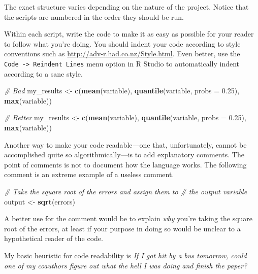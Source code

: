 \documentclass[12pt,oneside,openany]{tufte-book}
\newenvironment{Shaded}{}{}
\newcommand{\KeywordTok}[1]{\textcolor[rgb]{0.00,0.44,0.13}{\textbf{{#1}}}}
\newcommand{\DataTypeTok}[1]{\textcolor[rgb]{0.56,0.13,0.00}{{#1}}}
\newcommand{\FloatTok}[1]{\textcolor[rgb]{0.25,0.63,0.44}{{#1}}}
\newcommand{\StringTok}[1]{\textcolor[rgb]{0.25,0.44,0.63}{{#1}}}
\newcommand{\CommentTok}[1]{\textcolor[rgb]{0.38,0.63,0.69}{\textit{{#1}}}}
\newcommand{\NormalTok}[1]{{#1}}
\begin{document}
The exact structure varies depending on the nature of the project.
Notice that the scripts are numbered in the order they should be run.

Within each script, write the code to make it as easy as possible for
your reader to follow what you're doing. You should indent your code
according to style conventions such as
\url{http://adv-r.had.co.nz/Style.html}. Even better, use the
\texttt{Code\ -\textgreater{}\ Reindent\ Lines} menu option in R Studio
to automatically indent according to a sane style.

\begin{Shaded}
\begin{Highlighting}[]
\CommentTok{# Bad}
\NormalTok{my_results <-}\StringTok{ }\KeywordTok{c}\NormalTok{(}\KeywordTok{mean}\NormalTok{(variable),}
\KeywordTok{quantile}\NormalTok{(variable,}
\DataTypeTok{probs =} \FloatTok{0.25}\NormalTok{),}
\KeywordTok{max}\NormalTok{(variable))}

\CommentTok{# Better}
\NormalTok{my_results <-}\StringTok{ }\KeywordTok{c}\NormalTok{(}\KeywordTok{mean}\NormalTok{(variable),}
                \KeywordTok{quantile}\NormalTok{(variable,}
                         \DataTypeTok{probs =} \FloatTok{0.25}\NormalTok{),}
                \KeywordTok{max}\NormalTok{(variable))}
\end{Highlighting}
\end{Shaded}

Another way to make your code readable---one that, unfortunately, cannot
be accomplished quite so algorithmically---is to add explanatory
comments. The point of comments is not to document how the language
works. The following comment is an extreme example of a useless comment.

\begin{Shaded}
\begin{Highlighting}[]
\CommentTok{# Take the square root of the errors and assign them to}
\CommentTok{# the output variable}
\NormalTok{output <-}\StringTok{ }\KeywordTok{sqrt}\NormalTok{(errors)}
\end{Highlighting}
\end{Shaded}

A better use for the comment would be to explain \emph{why} you're
taking the square root of the errors, at least if your purpose in doing
so would be unclear to a hypothetical reader of the code.

My basic heuristic for code readability is \emph{If I got hit by a bus
tomorrow, could one of my coauthors figure out what the hell I was doing
and finish the paper?}
\end{document}
